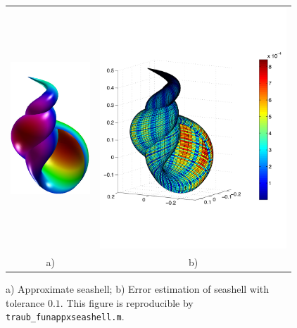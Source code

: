 \documentclass[review]{elsarticle}
\theoremstyle{definition}
\begin{document}
\begin{figure}[tbh]
  \centering
  \begin{tabular}{cc}
     \includegraphics[width=30mm]{figure/funappxseashell.pdf}
  & \includegraphics[width=70mm]{figure/seashellsurferror.pdf}
  \\ a)  & b)
  \end{tabular}
\caption{a) Approximate seashell; b) Error estimation of seashell with tolerance
$0.1$. This figure is reproducible by \texttt{traub\_funappxseashell.m}.}
\label{fig:funappxseashell}
\end{figure}
\end{document}
